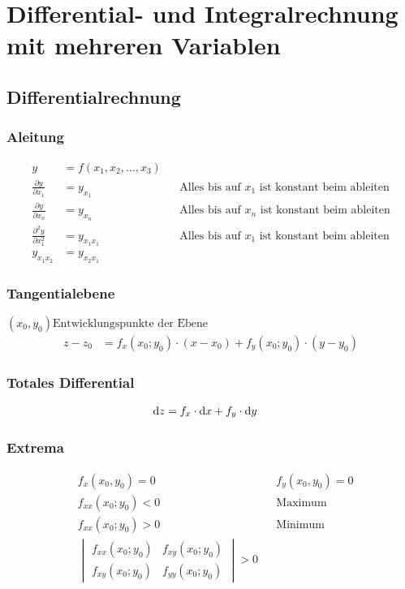 \section{Differential- und Integralrechnung mit mehreren Variablen}
\subsection{Differentialrechnung}

\subsubsection{Aleitung}
\begin{align*}
y&=f(x_1,x_2,\dots,x_3)\\
\frac{\partial y}{\partial x_1}&=y_{x_1}&&\text{Alles bis auf $x_1$ ist konstant beim ableiten}\\
\frac{\partial y}{\partial x_n}&=y_{x_n}&&\text{Alles bis auf $x_n$ ist konstant beim ableiten}\\
\frac{\partial^2 y}{\partial x_1^2}&=y_{x_1x_1}&&\text{Alles bis auf $x_1$ ist konstant beim ableiten}\\
y_{x_1x_2}&=y_{x_2x_1}
\end{align*}

\subsubsection{Tangentialebene}
\( \left(x_0, y_0 \right) \text{Entwicklungspunkte der Ebene} \)
\begin{align*}
z-z_0&=f_x\left(x_0;y_0\right)\cdot\left(x-x_0\right)+f_y\left(x_0;y_0\right)\cdot\left(y-y_0\right)
\end{align*}

\subsubsection{Totales Differential}
\begin{align*}
\mathop{}\!\mathrm{d} z&=f_x\cdot\mathop{}\!\mathrm{d} x+f_y\cdot\mathop{}\!\mathrm{d} y
\end{align*}

\subsubsection{Extrema}
\begin{align*}
&f_x(x_0,y_0)=0&&f_y(x_0,y_0)=0\\
&f_{xx}(x_0;y_0)<0&&\text{Maximum}\\
&f_{xx}(x_0;y_0)>0&&\text{Minimum}\\
&\begin{vmatrix}f_{xx}(x_0;y_0)&f_{xy}(x_0;y_0)\\f_{xy}(x_0;y_0)&f_{yy}(x_0;y_0)\end{vmatrix}>0
\end{align*}

